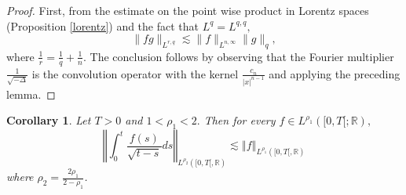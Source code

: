 \documentclass[11pt]{amsart}%
\theoremstyle{plain}
\numberwithin{equation}{section}
\newtheorem{corollary}{Corollary}[section]
\begin{document}
\begin{proof}
First, from the estimate on the point wise product in Lorentz spaces (Proposition \ref{lorentz}) and the fact that $L^q=L^{q,q},$
\[
\|fg\|_{L^{r,q}}\lesssim\|f\|_{L^{n,\infty}}\|g\|_{q},
\]
where $\frac{1}{r}=\frac{1}{q}+\frac{1}{n}.$ The conclusion follows by observing that the Fourier multiplier $\frac{1}{\sqrt{-\Delta}}$ is the convolution operator with the kernel $\frac{c_n}{|x|^{n-1}}$  and applying the preceding lemma.

\end{proof}

\begin{corollary} \label{cor2}
Let $T>0$ and $ 1<\rho _{1}<2.$ Then for every $f\in L^{\rho _{1}}([0,T[;%
\mathbb{R}),$
\[
\left\Vert \int_{0}^{t}\frac{f(s)}{\sqrt{t-s}}ds\right\Vert _{L^{\rho
_{2}}([0,T[,\mathbb{R})}\lesssim \left\Vert f\right\Vert _{L^{\rho _{1}}([0,T[,%
\mathbb{R})}
\]%
where $\rho _{2}=\frac{2\rho _{1}}{2-\rho _{1}}$.
\end{corollary}
\end{document}
